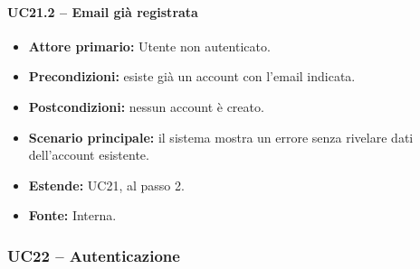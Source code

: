 \documentclass[12pt,a4paper]{article}
\newcommand{\tightlist}{\setlength{\itemsep}{1pt}\setlength{\parskip}{0pt}}
\begin{document}
\paragraph{UC21.2 -- Email già registrata}

\begin{itemize}

\tightlist

\item \textbf{Attore primario:} Utente non autenticato.

\item \textbf{Precondizioni:} esiste già un account con l'email indicata.

\item \textbf{Postcondizioni:} nessun account è creato.

\item \textbf{Scenario principale:} il sistema mostra un errore senza rivelare dati dell'account esistente.

\item \textbf{Estende:} UC21, al passo 2.

\item \textbf{Fonte:} Interna.

\end{itemize}



\subsubsection{UC22 -- Autenticazione}
\end{document}
